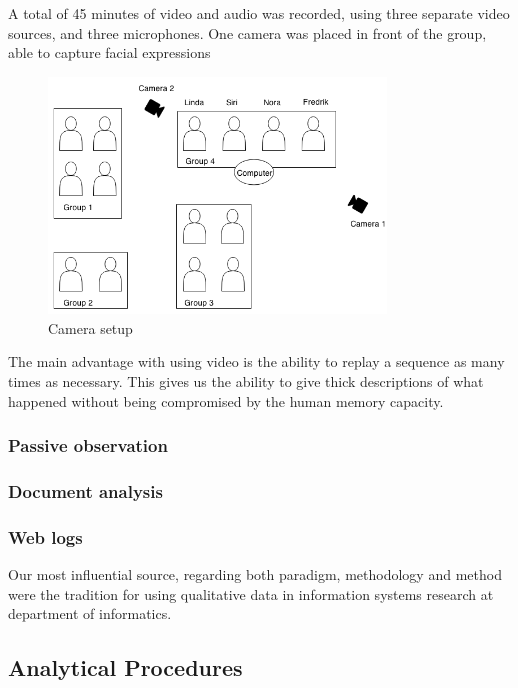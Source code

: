 A total of 45 minutes of video and audio was recorded, using three separate video sources, and three microphones. One camera was placed in front of the group, able to capture facial expressions
\begin{figure}
\centering
\includegraphics[width=0.8\textwidth]{img/empiricalsetting/class_diagram.png}
\caption{Camera setup}
\label{fig:camerasetup}
\end{figure}

The main advantage with using video is the ability to replay a sequence as many times as necessary. This gives us the ability to give thick descriptions of what happened without being compromised by the human memory capacity.

\subsubsection{Passive observation}

\subsubsection{Document analysis}

\subsubsection{Web logs}

Our most influential source, regarding both paradigm, methodology and method were the tradition for using qualitative data in information systems research at department of informatics. 



\subsection{Analytical Procedures}
